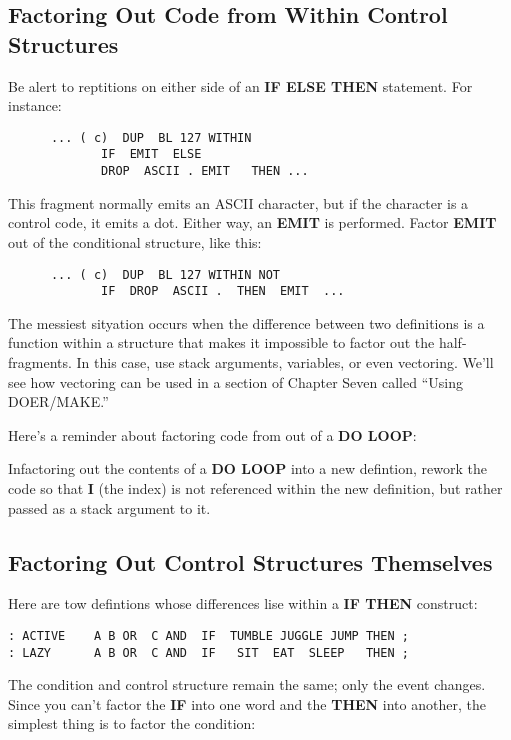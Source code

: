 \subsection{{Factoring Out Code from Within Control Structures}}

Be alert to reptitions on either side of an \textbf{IF ELSE THEN} statement. For instance:

\begin{verbatim}
      ... ( c)  DUP  BL 127 WITHIN
             IF  EMIT  ELSE
             DROP  ASCII . EMIT   THEN ...
\end{verbatim}
This fragment normally emits an ASCII character, but if the character is a control code, it emits a dot. Either way, an \textbf{EMIT} is performed. Factor \textbf{EMIT} out of the conditional structure, like this:

\begin{verbatim}
      ... ( c)  DUP  BL 127 WITHIN NOT
             IF  DROP  ASCII .  THEN  EMIT  ...
\end{verbatim}
The messiest sityation occurs when the difference between two definitions is a function within a structure that makes it impossible to factor out the half-fragments. In this case, use stack arguments, variables, or even vectoring. We'll see how vectoring can be used in a section of Chapter Seven called ``Using DOER/MAKE.''

Here's a reminder about factoring code from out of a \textbf{DO LOOP}:

\begin{tip}
Infactoring out the contents of a \textbf{DO LOOP} into a new defintion, rework the code so that \textbf{I} (the index) is not referenced within the new definition, but rather passed as a stack argument to it.
\end{tip}

\subsection{{Factoring Out Control Structures Themselves}}

Here are tow defintions whose differences lise within a \textbf{IF THEN} construct:

\begin{verbatim}
: ACTIVE    A B OR  C AND  IF  TUMBLE JUGGLE JUMP THEN ;
: LAZY      A B OR  C AND  IF   SIT  EAT  SLEEP   THEN ;
\end{verbatim}
The condition and control structure remain the same; only the event changes. Since you can't factor the \textbf{IF} into one word and the \textbf{THEN} into another, the simplest thing is to factor the condition:

